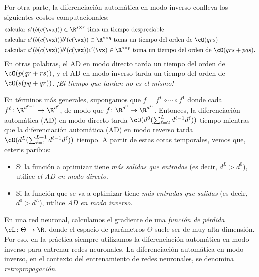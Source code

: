 \documentclass[../../book-main_es.tex]{subfiles}
\begin{document}
Por otra parte, la diferenciación automática en modo inverso conlleva los siguientes costos computacionales:
\begin{align}
    &\text{calcular}\ a^{\prime}(b(c(\vx))) \in \R^{s \times
    r}\ \text{tima un tiempo despreciable} \\
    &\text{calcular}\ a^{\prime}(b(c(\vx)))b^{\prime}(c(\vx)) \in
    \R^{s \times q}\ \text{toma un tiempo del orden de \(\cO(qrs)\)} \\
    &\text{calcular}\ a^{\prime}(b(c(\vx)))b^{\prime}(c(\vx))c^{\prime}(\vx)
    \in \R^{s \times p}\ \text{toma un tiempo del orden de \(\cO(qrs + pqs)\).}
\end{align}
En otras palabras, el AD en modo directo tarda un tiempo del orden de \(\cO(p(qr + rs))\),
y el AD en modo inverso tarda un tiempo del orden de \(\cO(s(pq + qr))\). \textit{¡El tiempo 
que tardan no es el mismo!}

En términos más generales, supongamos que \(f = f^{L} \circ \cdots \circ f^{1}\)
donde cada \(f^{\ell} \colon \R^{d^{\ell - 1}} \to \R^{d^{\ell}}\),
de modo que \(f \colon \R^{d^{0}} \to \R^{d^{L}}\). Entonces, la diferenciación automática (AD) en modo directo 
tarda \(\cO(d^{0}(\sum_{\ell = 2}^{L}d^{\ell - 1}d^{\ell}))\) tiempo
mientras que la diferenciación automática (AD) en modo reverso tarda \(\cO(d^{L}(\sum_{\ell = 1}^{L -
1}d^{\ell - 1}d^{\ell}))\) tiempo. A partir de estas cotas temporales, vemos que,
ceteris paribus:
\begin{itemize}
    \item Si la función a optimizar tiene \textit{más salidas que
        entradas} (es decir, \(d^{L} > d^{0}\)), utilice \textit{el AD en modo directo}.
    \item Si la función que se va a optimizar tiene \textit{más entradas que
        salidas} (es decir, \(d^{0} > d^{L}\)), utilice \textit{AD en modo inverso}.
\end{itemize}
En una red neuronal, calculamos el gradiente de una \textit{función de pérdida
} \(\cL \colon \Theta \to \R\), donde el espacio de parámetros
\(\Theta\) suele ser de muy alta dimensión. Por eso, en la práctica siempre
utilizamos la diferenciación automática en modo inverso para entrenar redes 
neuronales. La diferenciación automática en modo inverso, en el contexto del entrenamiento de redes neuronales, 
se denomina \textit{retropropagación}.
\end{document}
